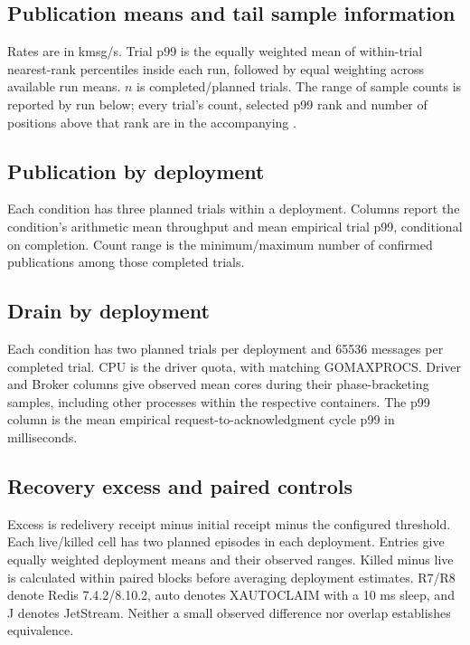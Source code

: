 \documentclass[11pt]{article}
\theoremstyle{definition}
\newcommand{\artifact}[1]{\texttt{\path{#1}}}
\begin{document}
\subsection{Publication means and tail sample information}
Rates are in kmsg/s. Trial p99 is the equally weighted mean of within-trial nearest-rank percentiles inside each run, followed by equal weighting across available run means. $n$ is completed/planned trials. The range of sample counts is reported by run below; every trial's count, selected p99 rank and number of positions above that rank are in the accompanying \artifact{followup/derived/trials.csv}.
\begingroup\footnotesize\setlength{\tabcolsep}{3pt}

\endgroup

\subsection{Publication by deployment}
Each condition has three planned trials within a deployment. Columns report the condition's arithmetic mean throughput and mean empirical trial p99, conditional on completion. Count range is the minimum/maximum number of confirmed publications among those completed trials.
\begingroup\footnotesize\setlength{\tabcolsep}{3pt}

\endgroup

\subsection{Drain by deployment}
Each condition has two planned trials per deployment and 65536 messages per completed trial. CPU is the driver quota, with matching GOMAXPROCS. Driver and Broker columns give observed mean cores during their phase-bracketing samples, including other processes within the respective containers. The p99 column is the mean empirical request-to-acknowledgment cycle p99 in milliseconds.
\begingroup\footnotesize\setlength{\tabcolsep}{3pt}

\endgroup

\subsection{Recovery excess and paired controls}
Excess is redelivery receipt minus initial receipt minus the configured threshold. Each live/killed cell has two planned episodes in each deployment. Entries give equally weighted deployment means and their observed ranges. Killed minus live is calculated within paired blocks before averaging deployment estimates. R7/R8 denote Redis 7.4.2/8.10.2, auto denotes XAUTOCLAIM with a 10 ms sleep, and J denotes JetStream. Neither a small observed difference nor overlap establishes equivalence.
\begingroup\footnotesize\setlength{\tabcolsep}{3pt}

\endgroup
\end{document}
